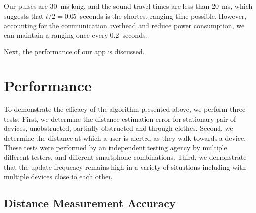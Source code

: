 \documentclass{article}
\begin{document}
Our pulses are 30~ms long, and the sound travel times are less than 20~ms, which suggests that $t/2=0.05$~seconds is the shortest ranging time possible. However, accounting for the communication overhead and reduce power consumption, we can maintain a ranging once every 0.2~seconds. 

Next, the performance of our app is discussed.

\section{Performance}
\label{sec:performance}
\FloatBarrier
To demonstrate the efficacy of the algorithm presented above, we perform three tests. First, we determine the distance estimation error for stationary pair of devices, unobstructed, partially obstructed and through clothes. Second, we determine the distance at which a user is alerted as they walk towards a device. These tests were performed by an independent testing agency by multiple different testers, and different smartphone combinations. Third, we demonstrate that the update frequency remains high in a variety of situations including with multiple devices close to each other.

\subsection{Distance Measurement Accuracy}
\end{document}
